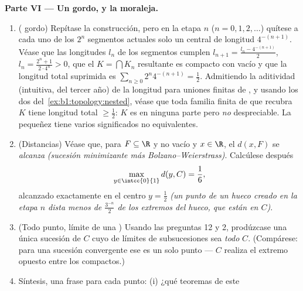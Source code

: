 \begin{problem}[{Problema del fin de semana --- el \omterm{pb:b1:topology:1}{conjunto de Cantor}
de los tercios centrales: longitud cero, no numerable, perfecto y
$C + C = \intcc{0}{2}$}]
\medskip
\noindent\textbf{Parte VI --- Un  gordo, y la moraleja.}
\begin{enumerate}[resume]
  \item ( gordo) Repítase la construcción, pero
        en la etapa $n$ ($n = 0, 1, 2, \dots$) quítese a cada uno de
        los $2^n$ segmentos actuales solo un  central
         de longitud $4^{-(n+1)}$. Véase que las longitudes
        $l_n$ de los segmentos cumplen
        $l_{n+1} = \frac{l_n - 4^{-(n+1)}}{2}$,
        $l_n = \frac{2^n + 1}{2\cdot 4^n} > 0$, que el $K = \bigcap
        K_n$ resultante es compacto con  vacío y que la
        longitud total suprimida es $\sum_{n\geq0} 2^n 4^{-(n+1)} =
        \frac12$. Admitiendo la aditividad (intuitiva, del tercer año)
        de la longitud para uniones finitas de , y usando
        los dos  del~\cref{ex:b1:topology:nested}, véase que
        toda familia finita de   que recubra $K$
        tiene longitud total $\geq \frac12$: $K$ es  en ninguna
        parte pero \emph{no} despreciable. La pequeñez tiene varios
        significados no equivalentes.
  \item (Distancias) Véase que, para $F \subseteq \R$  y no
        vacío y $x \in \R$, el  $d(x, F)$ se \emph{alcanza}
        \emph{(sucesión minimizante más Bolzano--Weierstrass)}.
        Calcúlese después
        \[
        \max_{y \in \intcc{0}{1}} d(y, C) = \frac16 ,
        \]
        alcanzado exactamente en el centro $y = \frac12$ \emph{(un
        punto de un hueco creado en la etapa $n$ dista menos de
        $\frac{3^{-n}}{2}$ de los extremos del hueco, que están en
        $C$)}.
  \item (Todo punto, límite de una ) Usando las
        preguntas 12 y 2, prodúzcase una única sucesión de $C$ cuyo
         de límites de subsucesiones sea \emph{todo} $C$.
        (Compárese: para una sucesión convergente ese  es un
        solo punto --- $C$ realiza el extremo opuesto entre los
        compactos.)
  \item Síntesis, una frase para cada punto: (i) ¿qué teoremas de este

\end{enumerate}
\end{problem}

